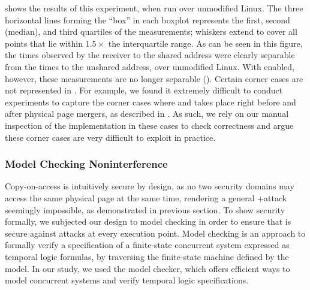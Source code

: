  shows the results of this
experiment, when run over unmodified Linux.
The three horizontal lines forming the ``box'' in each boxplot
represents the first, second (median), and third quartiles of the
\flushreload measurements; whiskers extend to cover all points that
lie within $1.5\times$ the interquartile range.  As can be seen in
this figure, the times observed by the receiver to \Reload the shared
address were clearly separable from the times to \Reload the unshared
address, over unmodified Linux.  With \cachebar enabled, however, these
measurements are no longer separable ().
Certain corner cases are not represented in
.  For example, we found it extremely
difficult to conduct experiments to capture the corner cases where
\Flush and \Reload takes place right before and after physical page
mergers, as described in . As such, we rely
on our manual inspection of the implementation in these cases to check
correctness and argue these corner cases are very difficult to exploit
in practice.

\subsubsection{Model Checking Noninterference}

\newcommand{\mcPagesArray}{\texttt{pages}\xspace}
\newcommand{\mcPages}[1]{\texttt{pages[{#1}]}\xspace}
\newcommand{\mcVirt}{\texttt{virt}\xspace}
\newcommand{\mcState}{\texttt{state}\xspace}
\newcommand{\mcOwner}{\texttt{owner}\xspace}
\newcommand{\mcNoOwner}{\texttt{none}\xspace}

\label{cachebar:sec:coa:security}
Copy-on-access is intuitively secure by design, as no two security
domains may access the same physical page at the same time, rendering
a general \Flush+\Reload attack seemingly impossible, as demonstrated in
previous section.  To show security formally, we subjected our design
to model checking in order to ensure that \coa is secure against
\flushreload attacks at every execution point.  Model checking is an
approach to formally verify a specification of a finite-state
concurrent system expressed as temporal logic formulas, by traversing
the finite-state machine defined by the model.  In our study, we used
the \spin model checker, which offers efficient ways to model
concurrent systems and verify temporal logic specifications.

